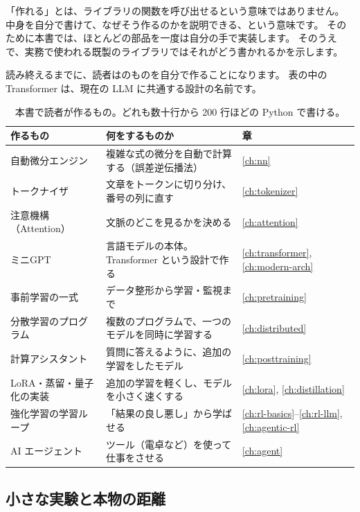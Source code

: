 「作れる」とは、ライブラリの関数を呼び出せるという意味ではありません。
中身を自分で書けて、なぜそう作るのかを説明できる、という意味です。
そのために本書では、ほとんどの部品を一度は自分の手で実装します。
そのうえで、実務で使われる既製のライブラリではそれがどう書かれるかを示します。

読み終えるまでに、読者はのものを自分で作ることになります。
表の中の Transformer は、現在の LLM に共通する設計の名前です。

\begin{table}[htbp]
\centering
\caption{本書で読者が作るもの。どれも数十行から 200 行ほどの Python で書ける。}
\label{tab:intro-artifacts}
\small
\begin{tabularx}{\linewidth}{@{}l>{\raggedright\arraybackslash}Xl@{}}
\toprule
作るもの & 何をするものか & 章 \\
\midrule
自動微分エンジン & 複雑な式の微分を自動で計算する（誤差逆伝播法） & \ref{ch:nn} \\
トークナイザ & 文章をトークンに切り分け、番号の列に直す & \ref{ch:tokenizer} \\
注意機構（Attention） & 文脈のどこを見るかを決める & \ref{ch:attention} \\
ミニGPT & 言語モデルの本体。Transformer という設計で作る & \ref{ch:transformer}, \ref{ch:modern-arch} \\
事前学習の一式 & データ整形から学習・監視まで & \ref{ch:pretraining} \\
分散学習のプログラム & 複数のプログラムで、一つのモデルを同時に学習する & \ref{ch:distributed} \\
計算アシスタント & 質問に答えるように、追加の学習をしたモデル & \ref{ch:posttraining} \\
LoRA・蒸留・量子化の実装 & 追加の学習を軽くし、モデルを小さく速くする & \ref{ch:lora}, \ref{ch:distillation} \\
強化学習の学習ループ & 「結果の良し悪し」から学ばせる & \ref{ch:rl-basics}--\ref{ch:rl-llm}, \ref{ch:agentic-rl} \\
AI エージェント & ツール（電卓など）を使って仕事をさせる & \ref{ch:agent} \\
\bottomrule
\end{tabularx}
\end{table}

\subsection*{小さな実験と本物の距離}

